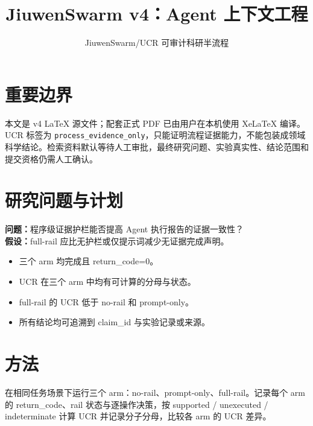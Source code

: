 \documentclass[UTF8]{ctexart}
\title{JiuwenSwarm v4：Agent 上下文工程}
\author{JiuwenSwarm/UCR 可审计科研半流程}
\date{}
\begin{document}
\maketitle
\section{重要边界}
本文是 v4 LaTeX 源文件；配套正式 PDF 已由用户在本机使用 XeLaTeX 编译。UCR 标签为 \texttt{process\_evidence\_only}，只能证明流程证据能力，不能包装成领域科学结论。检索资料默认等待人工审批，最终研究问题、实验真实性、结论范围和提交资格仍需人工确认。
\section{研究问题与计划}
\textbf{问题：}程序级证据护栏能否提高 Agent 执行报告的证据一致性？\\
\textbf{假设：}full-\allowbreak{}rail 应比无护栏或仅提示词减少无证据完成声明。
\begin{itemize}
\item 三个 arm 均完成且 return\_\allowbreak{}code=0。
\item UCR 在三个 arm 中均有可计算的分母与状态。
\item full-\allowbreak{}rail 的 UCR 低于 no-\allowbreak{}rail 和 prompt-\allowbreak{}only。
\item 所有结论均可追溯到 claim\_\allowbreak{}id 与实验记录或来源。
\end{itemize}
\section{方法}
在相同任务场景下运行三个 arm：no-\allowbreak{}rail、prompt-\allowbreak{}only、full-\allowbreak{}rail。记录每个 arm 的 return\_\allowbreak{}code、rail 状态与逐操作决策，按 supported / unexecuted / indeterminate 计算 UCR 并记录分子分母，比较各 arm 的 UCR 差异。
\end{document}
